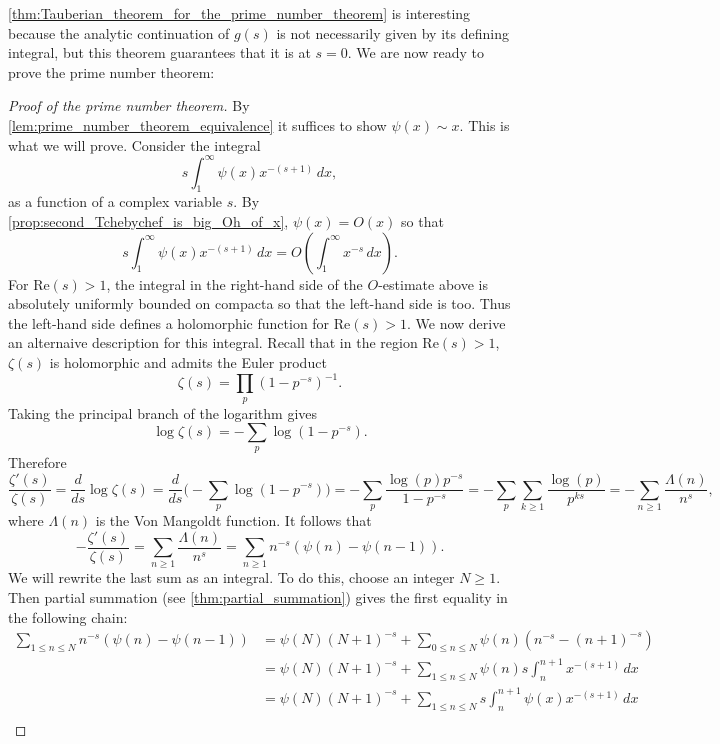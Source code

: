 \documentclass[12pt]{book}
\theoremstyle{definition}\newframedtheorem{method}{Method}
\newcommand{\z}{\zeta}
\renewcommand{\L}{\Lambda}
\newcommand{\<}{\langle}
\renewcommand{\>}{\rangle}
\renewcommand{\Re}{\mathrm{Re}}
\begin{document}
      \cref{thm:Tauberian_theorem_for_the_prime_number_theorem} is interesting because the analytic continuation of $g(s)$ is not necessarily given by its defining integral, but this theorem guarantees that it is at $s = 0$. We are now ready to prove the prime number theorem:

      \begin{proof}[Proof of the prime number theorem]
        By \cref{lem:prime_number_theorem_equivalence} it suffices to show $\psi(x) \sim x$. This is what we will prove. Consider the integral
        \[
          s\int_{1}^{\infty}\psi(x)x^{-(s+1)}\,dx,
        \]
        as a function of a complex variable $s$. By \cref{prop:second_Tchebychef_is_big_Oh_of_x}, $\psi(x) = O(x)$ so that
        \[
          s\int_{1}^{\infty}\psi(x)x^{-(s+1)}\,dx = O\left(\int_{1}^{\infty}x^{-s}\,dx\right).
        \]
        For $\Re(s) > 1$, the integral in the right-hand side of the $O$-estimate above is absolutely uniformly bounded on compacta so that the left-hand side is too. Thus the left-hand side defines a holomorphic function for $\Re(s) > 1$. We now derive an alternaive description for this integral. Recall that in the region $\Re(s) > 1$, $\z(s)$ is holomorphic and admits the Euler product
        \[
          \z(s) = \prod_{p}(1-p^{-s})^{-1}.
        \]
        Taking the principal branch of the logarithm gives
        \[
          \log\z(s) = -\sum_{p}\log(1-p^{-s}).
        \]
        Therefore
        \[
          \frac{\z'(s)}{\z(s)} = \frac{d}{ds}\log\z(s) = \frac{d}{ds}\bigg(-\sum_{p}\log(1-p^{-s})\bigg) = -\sum_{p}\frac{\log(p)p^{-s}}{1-p^{-s}} = -\sum_{p}\sum_{k \ge 1}\frac{\log(p)}{p^{ks}} = -\sum_{n \ge 1}\frac{\L(n)}{n^{s}},
        \]
        where $\L(n)$ is the Von Mangoldt function. It follows that
        \[
          -\frac{\z'(s)}{\z(s)} = \sum_{n \ge 1}\frac{\L(n)}{n^{s}} = \sum_{n \ge 1}n^{-s}(\psi(n)-\psi(n-1)).
        \]
        We will rewrite the last sum as an integral. To do this, choose an integer $N \ge 1$. Then partial summation (see \cref{thm:partial_summation}) gives the first equality in the following chain:
        \begin{align*}
          \sum_{1 \le n \le N}n^{-s}(\psi(n)-\psi(n-1)) &= \psi(N)(N+1)^{-s}+\sum_{0 \le n \le N}\psi(n)(n^{-s}-(n+1)^{-s}) \\
          &= \psi(N)(N+1)^{-s}+\sum_{1 \le n \le N}\psi(n)s\int_{n}^{n+1}x^{-(s+1)}\,dx \\
          &= \psi(N)(N+1)^{-s}+\sum_{1 \le n \le N}s\int_{n}^{n+1}\psi(x)x^{-(s+1)}\,dx \\

\end{align*}
\end{proof}
\end{document}
